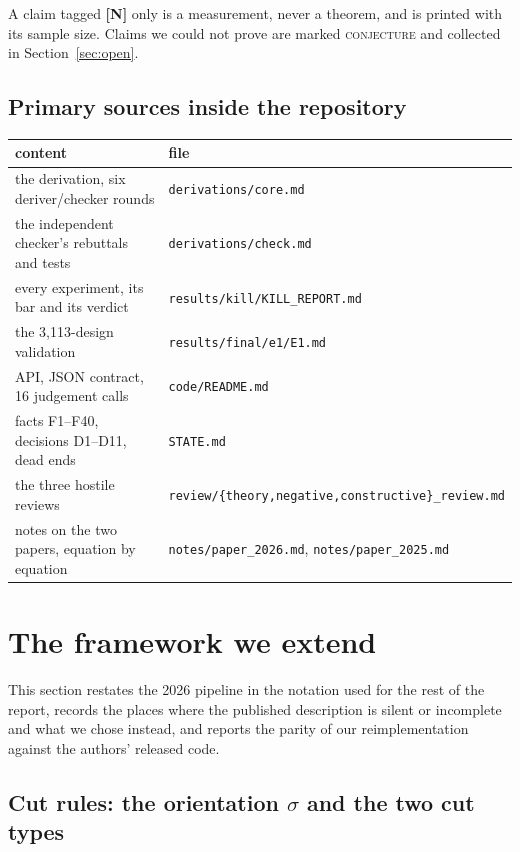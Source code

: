 \documentclass[11pt,a4paper]{article}
\theoremstyle{definition}
\newcommand{\file}[1]{\texttt{\small #1}}
\begin{document}
\noindent A claim tagged \textbf{[N]} only is a measurement, never a theorem, and is
printed with its sample size. Claims we could not prove are marked \textsc{conjecture}
and collected in Section~\ref{sec:open}.

\subsection{Primary sources inside the repository}

\begin{center}
\small
\begin{tabular}{@{}ll@{}}
\toprule
content & file \\
\midrule
the derivation, six deriver/checker rounds & \file{derivations/core.md} \\
the independent checker's rebuttals and tests & \file{derivations/check.md} \\
every experiment, its bar and its verdict & \file{results/kill/KILL\_REPORT.md} \\
the 3{,}113-design validation & \file{results/final/e1/E1.md} \\
API, JSON contract, 16 judgement calls & \file{code/README.md} \\
facts F1--F40, decisions D1--D11, dead ends & \file{STATE.md} \\
the three hostile reviews & \file{review/\{theory,negative,constructive\}\_review.md} \\
notes on the two papers, equation by equation & \file{notes/paper\_2026.md}, \file{notes/paper\_2025.md} \\
\bottomrule
\end{tabular}
\end{center}

\clearpage
\section{The framework we extend}
\label{sec:framework}

This section restates the 2026 pipeline in the notation used for the rest of the report,
records the places where the published description is silent or incomplete and what we
chose instead, and reports the parity of our reimplementation against the authors' released
code.

\subsection{Cut rules: the orientation \texorpdfstring{$\sigma$}{sigma} and the two cut types}
\end{document}
